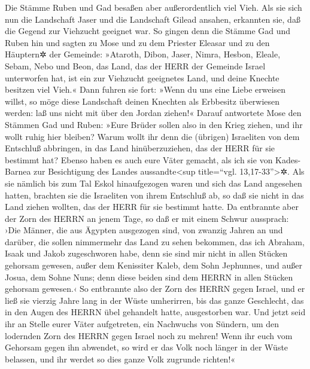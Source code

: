 Die Stämme Ruben und Gad besaßen aber außerordentlich viel
Vieh. Als sie sich nun die Landschaft Jaser und die Landschaft Gilead
ansahen, erkannten sie, daß die Gegend zur Viehzucht geeignet war.
So gingen denn die Stämme Gad und Ruben hin und sagten zu
Mose und zu dem Priester Eleasar und zu den Häuptern✲ der Gemeinde:
»Ataroth, Dibon, Jaser, Nimra, Hesbon, Eleale, Sebam, Nebo
und Beon, das Land, das der HERR der Gemeinde Israel
unterworfen hat, ist ein zur Viehzucht geeignetes Land, und deine
Knechte besitzen viel Vieh.« Dann fuhren sie fort: »Wenn
du uns eine Liebe erweisen willst, so möge diese Landschaft deinen
Knechten als Erbbesitz überwiesen werden: laß uns nicht mit über den
Jordan ziehen!« Darauf antwortete Mose den Stämmen Gad und
Ruben: »Eure Brüder sollen also in den Krieg ziehen, und ihr wollt ruhig
hier bleiben? Warum wollt ihr denn die (übrigen)
Israeliten von dem Entschluß abbringen, in das Land hinüberzuziehen, das
der HERR für sie bestimmt hat? Ebenso haben es auch eure
Väter gemacht, als ich sie von Kades-Barnea zur Besichtigung des Landes
aussandte\textless sup title=``vgl. 13,17-33''\textgreater✲.
Als sie nämlich bis zum Tal Eskol hinaufgezogen waren und
sich das Land angesehen hatten, brachten sie die Israeliten von ihrem
Entschluß ab, so daß sie nicht in das Land ziehen wollten, das der HERR
für sie bestimmt hatte. Da entbrannte aber der Zorn des
HERRN an jenem Tage, so daß er mit einem Schwur aussprach:
›Die Männer, die aus Ägypten ausgezogen sind, von zwanzig
Jahren an und darüber, die sollen nimmermehr das Land zu sehen bekommen,
das ich Abraham, Isaak und Jakob zugeschworen habe, denn sie sind mir
nicht in allen Stücken gehorsam gewesen, außer dem
Kenissiter Kaleb, dem Sohn Jephunnes, und außer Josua, dem Sohne Nuns;
denn diese beiden sind dem HERRN in allen Stücken gehorsam gewesen.‹
So entbrannte also der Zorn des HERRN gegen Israel, und
er ließ sie vierzig Jahre lang in der Wüste umherirren, bis das ganze
Geschlecht, das in den Augen des HERRN übel gehandelt hatte,
ausgestorben war. Und jetzt seid ihr an Stelle eurer
Väter aufgetreten, ein Nachwuchs von Sündern, um den lodernden Zorn des
HERRN gegen Israel noch zu mehren! Wenn ihr euch vom
Gehorsam gegen ihn abwendet, so wird er das Volk noch länger in der
Wüste belassen, und ihr werdet so dies ganze Volk zugrunde richten!«

